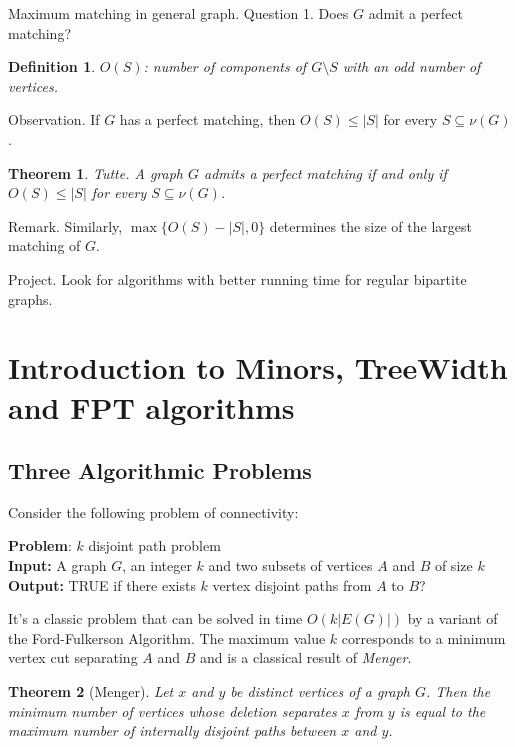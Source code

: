 \documentclass[12pt,a4paper]{article}
\newtheorem{theorem}{Theorem}
\newtheorem{definition}{Definition}
\begin{document}
Maximum matching in general graph.  Question 1.  Does \(G\) admit a perfect
matching?

\begin{definition}
  \(O(S)\): number of components of \(G \setminus S\) with an odd number of
  vertices.
\end{definition}

Observation.  If \(G\) has a perfect matching, then \(O(S) \leq |S|\) for every
\(S \subseteq \nu(G)\).

\begin{theorem}
  Tutte.  A graph \(G\) admits a perfect matching if and only if
  \(O(S) \leq |S|\) for every \(S \subseteq \nu(G)\).
\end{theorem}

Remark.  Similarly, \(\max\{O(S) - |S|, 0\}\) determines the size of the largest
matching of \(G\).

Project.  Look for algorithms with better running time for regular bipartite
graphs.

\section{Introduction to Minors, TreeWidth and FPT algorithms}
\subsection{Three Algorithmic Problems}
Consider the following problem of connectivity:

\vspace{0.2cm}
\noindent \textbf{Problem}: $k$ disjoint path problem\\
\textbf{Input:} A graph $G$, an integer $k$ and two subsets of vertices $A$ and
$B$ of size $k$\\
\textbf{Output:} TRUE if there exists $k$ vertex disjoint paths from $A$ to $B$?\\
\vspace{0.2cm}

\noindent It's a classic problem that can be solved in time $O(k|E(G)|)$ by a
variant of the Ford-Fulkerson Algorithm.  The maximum value $k$ corresponds to a
minimum vertex cut separating $A$ and $B$ and is a classical result of
\textit{Menger}.

\begin{theorem}[Menger]
  Let $x$ and $y$ be distinct vertices of a graph $G$.  Then the minimum number
  of vertices whose deletion separates $x$ from $y$ is equal to the maximum
  number of internally disjoint paths between $x$ and $y$.
\end{theorem}
\end{document}
